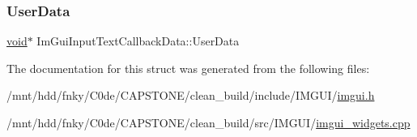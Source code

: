 \mbox{\label{structImGuiInputTextCallbackData_ae8358ea4135032204fcba6c9ada7c49f}} 
\subsubsection{\texorpdfstring{User\+Data}{UserData}}
{\footnotesize\ttfamily \hyperlink{imgui__impl__opengl3__loader_8h_ac668e7cffd9e2e9cfee428b9b2f34fa7}{void}$\ast$ Im\+Gui\+Input\+Text\+Callback\+Data\+::\+User\+Data}



The documentation for this struct was generated from the following files\+:\begin{DoxyCompactItemize}
\item 
/mnt/hdd/fnky/\+C0de/\+C\+A\+P\+S\+T\+O\+N\+E/clean\+\_\+build/include/\+I\+M\+G\+U\+I/\hyperlink{imgui_8h}{imgui.\+h}\item 
/mnt/hdd/fnky/\+C0de/\+C\+A\+P\+S\+T\+O\+N\+E/clean\+\_\+build/src/\+I\+M\+G\+U\+I/\hyperlink{imgui__widgets_8cpp}{imgui\+\_\+widgets.\+cpp}\end{DoxyCompactItemize}
